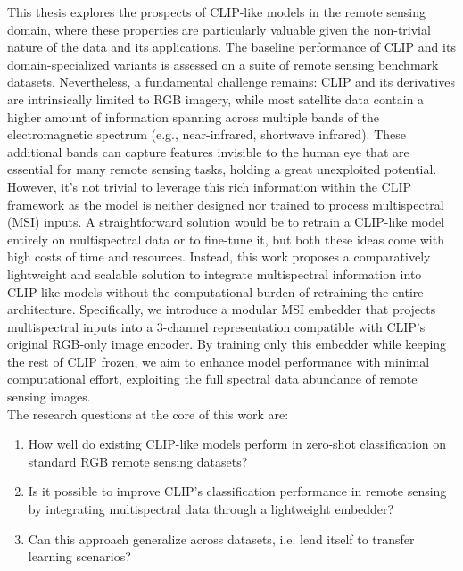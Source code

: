 \documentclass[a4paper, twoside, english]{sapthesis} %
\begin{document}
This thesis explores the prospects of CLIP-like models in the remote sensing domain, where these properties are particularly valuable given the non-trivial nature of the data and its applications. The baseline performance of CLIP and its domain-specialized variants \cite{liu2024remoteclip} \cite{zhang2024rs5m} \cite{wang2024skyscript} is assessed on a suite of remote sensing benchmark datasets. Nevertheless, a fundamental challenge remains: CLIP and its derivatives are intrinsically limited to RGB imagery, while most satellite data contain a higher amount of information spanning across multiple bands of the electromagnetic spectrum (e.g., near-infrared, shortwave infrared). These additional bands can capture features invisible to the human eye that are essential for many remote sensing tasks, holding a great unexploited potential. However, it's not trivial to leverage this rich information within the CLIP framework as the model is neither designed nor trained to process multispectral (MSI) inputs. A straightforward solution would be to retrain a CLIP-like model entirely on multispectral data \cite{marimo2025beyond} or to fine-tune it, but both these ideas come with high costs of time and resources. Instead, this work proposes a comparatively lightweight and scalable solution to integrate multispectral information into CLIP-like models without the computational burden of retraining the entire architecture. Specifically, we introduce a modular MSI embedder that projects multispectral inputs into a 3-channel representation compatible with CLIP's original RGB-only image encoder. By training only this embedder while keeping the rest of CLIP frozen, we aim to enhance model performance with minimal computational effort, exploiting the full spectral data abundance of remote sensing images. \\

The research questions at the core of this work are:

\begin{enumerate}
    \item How well do existing CLIP-like models perform in zero-shot classification on standard RGB remote sensing datasets?
    \item Is it possible to improve CLIP's classification performance in remote sensing by integrating multispectral data through a lightweight embedder?
    \item Can this approach generalize across datasets, i.e. lend itself to transfer learning scenarios?
\end{enumerate}
\end{document}
